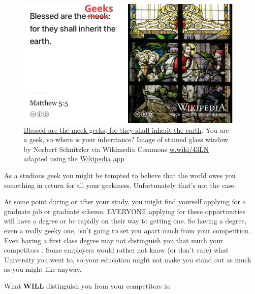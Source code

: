 \documentclass[
]{book}
\begin{document}
\begin{figure}

{\centering \includegraphics[width=0.99\linewidth]{images/blessed-are-the-geeks} 

}

\caption{\href{https://en.wikipedia.org/wiki/Matthew_5:5}{Blessed are the \sout{meek} geeks, for they shall inherit the earth}. \citep{inherit, blessed} You are a geek, so where is your inheritance? Image of stained glass window by Norbert Schnitzler via Wikimedia Commons \href{https://w.wiki/43LN}{w.wiki/43LN} adapted using the \href{https://apps.apple.com/us/app/wikipedia/id324715238}{Wikipedia app}}\label{fig:geekout-fig}
\end{figure}



As a studious geek you might be tempted to believe that the world owes you something in return for all your geekiness. Unfortunately that's not the case.

At some point during or after your study, you might find yourself applying for a graduate job or graduate scheme. EVERYONE applying for these opportunities will have a degree or be rapidly on their way to getting one. So having a degree, even a really geeky one, isn't going to set you apart much from your competition. Even having a first class degree may not distinguish you that much your competitors \citep{gradeinflation, firstclass}. Some employers would rather not know (or don't care) what University you went to, so your education might not make you stand out as much as you might like anyway. \citep{bigfour, eyfirm}

What \textbf{WILL} distinguish you from your competitors is:
\end{document}
